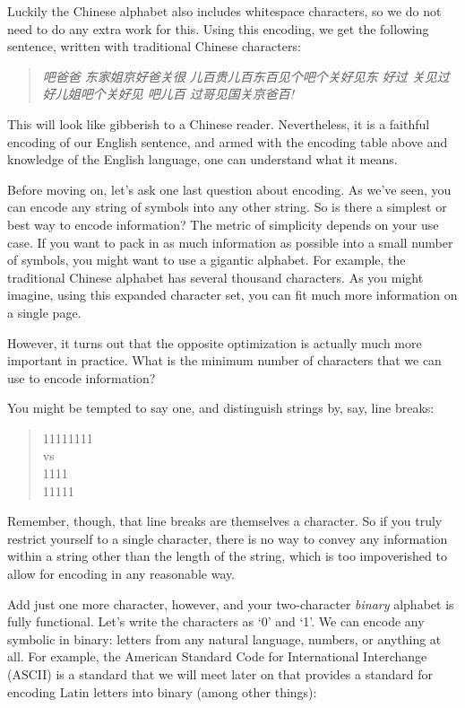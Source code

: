 \documentclass[UTF8]{book}
\begin{document}
\begin{CJK}{UTF8}{gbsn}
Luckily the Chinese alphabet also includes whitespace characters, so we do not need to do any extra work for this. Using this encoding, we get the following sentence, written with traditional Chinese characters:

\begin{quotation}
\centering
\emph{吧爸爸 东家姐京好爸关很 儿百贵儿百东百见个吧个关好见东 好过 关见过好儿姐吧个关好见 吧儿百 过哥见国关京爸百!}
\end{quotation}

This will look like gibberish to a Chinese reader. Nevertheless, it is a faithful encoding of our English sentence, and armed with the encoding table above and knowledge of the English language, one can understand what it means.

Before moving on, let's ask one last question about encoding. As we've seen, you can encode any string of symbols into any other string. So is there a simplest or best way to encode information? The metric of simplicity depends on your use case. If you want to pack in as much information as possible into a small number of symbols, you might want to use a gigantic alphabet. For example, the traditional Chinese alphabet has several thousand characters. As you might imagine, using this expanded character set, you can fit much more information on a single page.

However, it turns out that the opposite optimization is actually much more important in practice. What is the minimum number of characters that we can use to encode information?

You might be tempted to say one, and distinguish strings by, say, line breaks:

\begin{quotation}
\centering

11111111 \\

vs \\

1111 \\
11111

\end{quotation}

Remember, though, that line breaks are themselves a character. So if you truly restrict yourself to a single character, there is no way to convey any information within a string other than the length of the string, which is too impoverished to allow for encoding in any reasonable way.

Add just one more character, however, and your two-character \emph{binary} alphabet is fully functional. Let's write the characters as `0' and `1'. We can encode any symbolic in binary: letters from any natural language, numbers, or anything at all. For example, the American Standard Code for International Interchange (ASCII) is a standard that we will meet later on that provides a standard for encoding Latin letters into binary (among other things):


\end{CJK}
\end{document}
